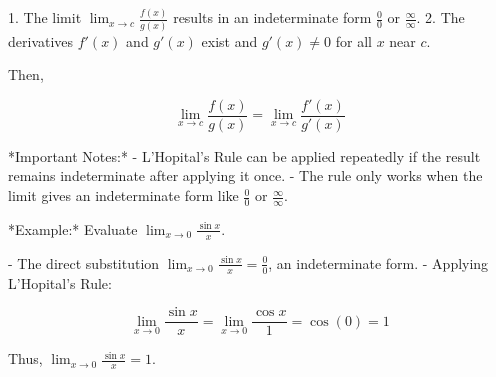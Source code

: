 \documentclass[12pt,a4paper]{article}
\begin{document}
1. The limit \( \lim_{x \to c} \frac{f(x)}{g(x)} \) results in an indeterminate form \( \frac{0}{0} \) or \( \frac{\infty}{\infty} \).
2. The derivatives \( f'(x) \) and \( g'(x) \) exist and \( g'(x) \neq 0 \) for all \( x \) near \( c \).

Then, 

\[
\lim_{x \to c} \frac{f(x)}{g(x)} = \lim_{x \to c} \frac{f'(x)}{g'(x)}
\]

*Important Notes:*
- L'Hopital's Rule can be applied repeatedly if the result remains indeterminate after applying it once.
- The rule only works when the limit gives an indeterminate form like \( \frac{0}{0} \) or \( \frac{\infty}{\infty} \).

*Example:*
Evaluate \( \lim_{x \to 0} \frac{\sin x}{x} \).

- The direct substitution \( \lim_{x \to 0} \frac{\sin x}{x} = \frac{0}{0} \), an indeterminate form.
- Applying L'Hopital's Rule:

\[
\lim_{x \to 0} \frac{\sin x}{x} = \lim_{x \to 0} \frac{\cos x}{1} = \cos(0) = 1
\]

Thus, \( \lim_{x \to 0} \frac{\sin x}{x} = 1 \).
\end{document}
